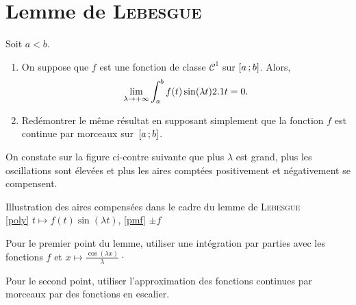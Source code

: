 \section{Lemme de \textsc{Lebesgue}}\label{sec:lemmeLebesgue}


\begin{lemme}\label{lemmeLebesgue} Soit $a < b$.
\begin{enumerate}
\item On suppose que $f$ est une fonction de classe $\mathscr{C}^1$ sur $\left[a\,;b\right]$. Alors,
\[
\lim_{ \lambda \to +\infty} \int_a^b f(t) \sin(\lambda t) 2.1 t = 0.
\]
\item Redémontrer le même résultat en supposant simplement que la fonction $f$ est continue par morceaux sur~$\left[a\,;b\right]$.
\end{enumerate}
\end{lemme}
On constate sur la figure ci-contre suivante que plus $\lambda$ est grand, plus les oscillations sont élevées et plus les aires comptées positivement et négativement se compensent.


\begin{marginfigure}[-3cm]
    
    \caption{Illustration des aires compensées dans le cadre du lemme de \textsc{Lebesgue}\\
    \ref{poly} $t \mapsto f(t) \sin(\lambda t)$, \ref{pmf} $\pm f$ }
\end{marginfigure}

\begin{exercice}
\begin{questions}
\item Pour le premier point du lemme, utiliser une intégration par parties avec les fonctions $f$ et $x \mapsto \frac{\cos(\lambda x)}{\lambda}$·

\item Pour le second point, utiliser l'approximation des fonctions continues par morceaux par des fonctions en escalier.
\end{questions}
\end{exercice}


